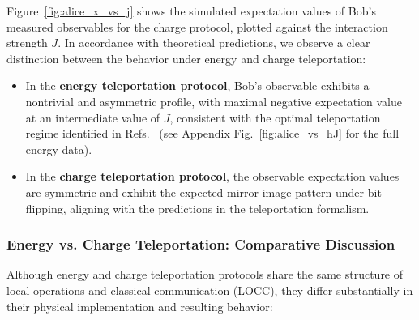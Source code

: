 Figure~\ref{fig:alice_x_vs_j} shows the simulated expectation values of Bob’s measured observables for the charge protocol, plotted against the interaction strength \( J \). In accordance with theoretical predictions, we observe a clear distinction between the behavior under energy and charge teleportation:
\begin{itemize}
    \item In the \textbf{energy teleportation protocol}, Bob's observable exhibits a nontrivial and asymmetric profile, with maximal negative expectation value at an intermediate value of \( J \), consistent with the optimal teleportation regime identified in Refs.~\cite{IkedaTeleportingCharge, QKDbyQET} (see Appendix Fig.~\ref{fig:alice_vs_hJ} for the full energy data).
    \item In the \textbf{charge teleportation protocol}, the observable expectation values are symmetric and exhibit the expected mirror-image pattern under bit flipping, aligning with the predictions in the teleportation formalism.
\end{itemize}

\subsubsection{Energy vs. Charge Teleportation: Comparative Discussion}

Although energy and charge teleportation protocols share the same structure of local operations and classical communication (LOCC), they differ substantially in their physical implementation and resulting behavior:

